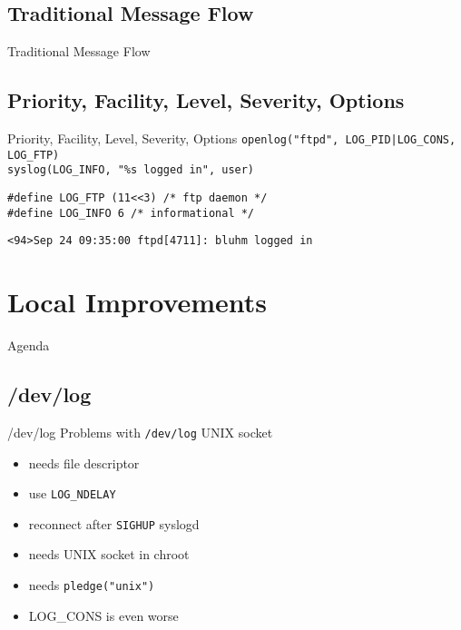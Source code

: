\documentclass[14pt]{beamer}
\begin{document}
\subsection{Traditional Message Flow}
\begin{frame}{Traditional Message Flow}
\end{frame}

\subsection{Priority, Facility, Level, Severity, Options}
\begin{frame}{Priority, Facility, Level, Severity, Options}
    \texttt{openlog("ftpd", LOG\_PID|LOG\_CONS, LOG\_FTP)}\\
    \texttt{syslog(LOG\_INFO, "\%s logged in", user)}

    \vspace{.5cm}
    \texttt{\#define LOG\_FTP  (11<<3) /* ftp daemon */}\\
    \texttt{\#define LOG\_INFO 6       /* informational */ }

    \vspace{.5cm}
    \texttt{<94>Sep 24 09:35:00 ftpd[4711]:\ bluhm logged in}
\end{frame}

\section{Local Improvements}

\begin{frame}{Agenda}
\tableofcontents[currentsection]
\end{frame}

\subsection{/dev/log}
\begin{frame}{/dev/log}
Problems with \texttt{/dev/log} UNIX socket
\begin{itemize}
    \item needs file descriptor
    \item use \texttt{LOG\_NDELAY}
    \item reconnect after \texttt{SIGHUP} syslogd
    \item needs UNIX socket in chroot
    \item needs \texttt{pledge("unix")}
    \item LOG\_CONS is even worse
\end{itemize}
\end{frame}
\end{document}
